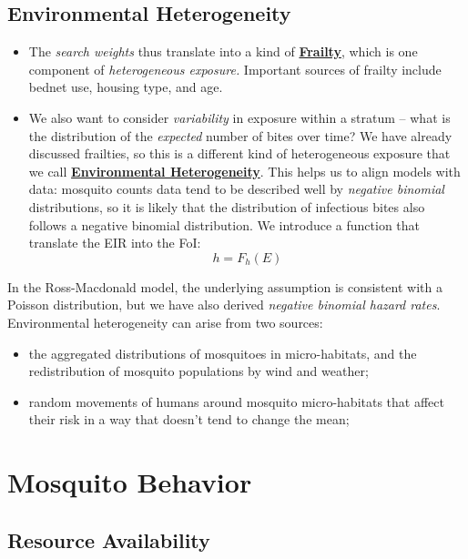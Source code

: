 \documentclass[
]{book}
\begin{document}
\hypertarget{environmental-heterogeneity}{%
\subsection{Environmental Heterogeneity}\label{environmental-heterogeneity}}

\begin{itemize}
\item
  The \emph{search weights} thus translate into a kind of \textbf{\protect\hyperlink{frailty}{Frailty}}, which is one component of \emph{heterogeneous exposure.} Important sources of frailty include bednet use, housing type, and age.
\item
  We also want to consider \emph{variability} in exposure within a stratum -- what is the distribution of the \emph{expected} number of bites over time? We have already discussed frailties, so this is a different kind of heterogeneous exposure that we call \textbf{\protect\hyperlink{environmentalHeterogeneity}{Environmental Heterogeneity}}. This helps us to align models with data: mosquito counts data tend to be described well by \emph{negative binomial} distributions, so it is likely that the distribution of infectious bites also follows a negative binomial distribution. We introduce a function that translate the EIR into the FoI:
  \[h=F_h(E)\]
\end{itemize}

In the Ross-Macdonald model, the underlying assumption is consistent with a Poisson distribution, but we have also derived \emph{negative binomial hazard rates}. Environmental heterogeneity can arise from two sources:

\begin{itemize}
\item
  the aggregated distributions of mosquitoes in micro-habitats, and the redistribution of mosquito populations by wind and weather;
\item
  random movements of humans around mosquito micro-habitats that affect their risk in a way that doesn't tend to change the mean;
\end{itemize}

\hypertarget{mosquito-behavior}{%
\section{Mosquito Behavior}\label{mosquito-behavior}}

\hypertarget{resource-availability}{%
\subsection{Resource Availability}\label{resource-availability}}
\end{document}
